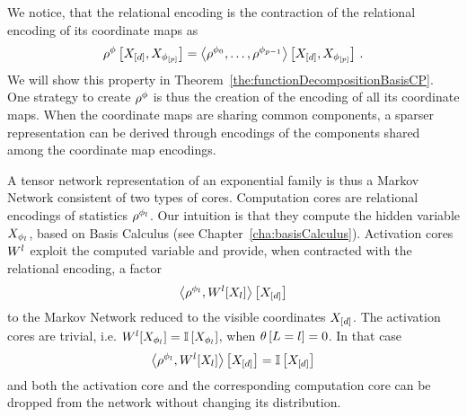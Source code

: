 We notice, that the relational encoding is the contraction of the relational encoding of its coordinate maps as 
	\[ \rho^{\phi}\left[X_{[d]},X_{\phi_{[p]}}\right] = \left\langle \rho^{\phi_{0}},\ldots,\rho^{\phi_{p-1}}\right\rangle \left[ X_{[d]},X_{\phi_{[p]}} \right] \, .  \]
We will show this property in Theorem~\ref{the:functionDecompositionBasisCP}.
One strategy to create $\rho^{\phi}$ is thus the creation of the encoding of all its coordinate maps.
When the coordinate maps are sharing common components, a sparser representation can be derived through encodings of the components shared among the coordinate map encodings.


A tensor network representation of an exponential family is thus a Markov Network consistent of two types of cores.
Computation cores are relational encodings of statistics $\rho^{\phi_{l}}$.
Our intuition is that they compute the hidden variable $X_{\phi_{l}}$, based on Basis Calculus (see Chapter~\ref{cha:basisCalculus}).
Activation cores $W^{l}$ exploit the computed variable and provide, when contracted with the relational encoding, a factor 
	\[ \left\langle \rho^{\phi_{l}}, W^{l}[X_{l}]\right\rangle \left[ X_{[d]} \right]  \]
to the Markov Network reduced to the visible coordinates $X_{[d]}$.
The activation cores are trivial, i.e. $W^{l}[X_{\phi_{l}}]=\mathbb{I}\left[X_{\phi_{l}}\right]$, when $\theta\left[L=l\right]=0$.
In that case 
	\[  \left\langle \rho^{\phi_{l}}, W^{l}[X_{l}]\right\rangle \left[ X_{[d]} \right] 
	= \mathbb{I}\left[X_{[d]}\right] \]
and both the activation core and the corresponding computation core can be dropped from the network without changing its distribution.

